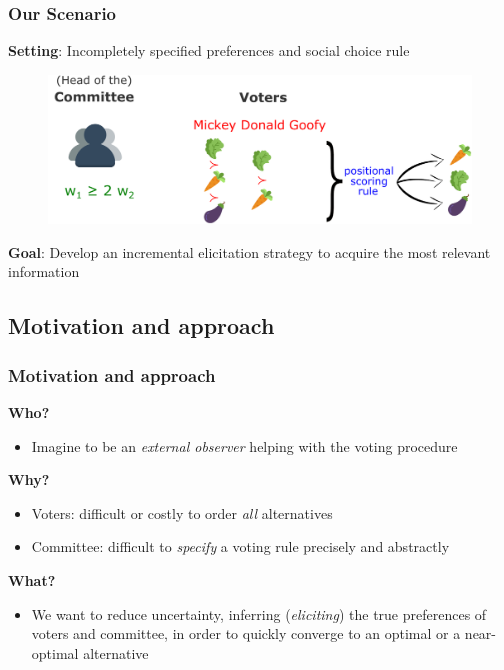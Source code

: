 \documentclass{beamer}
\begin{document}
\begin{frame}[t]
\frametitle{Our Scenario}
\textbf{Setting}: Incompletely specified preferences and social choice rule \bigskip
\begin{figure}
	\includegraphics[scale=0.35]{ourset.png}
\end{figure}
 \textbf{Goal}: Develop an incremental elicitation strategy to acquire the most relevant information 
\end{frame}

\subsection{Motivation and approach}
\begin{frame}
	\frametitle{Motivation and approach}
	\textbf{Who?}
	\begin{itemize}
		\item Imagine to be an \emph{external observer} helping with the voting procedure
	\end{itemize}
	 \textbf{Why?}
	\begin{itemize}
		\item Voters: difficult or costly to order \emph{all} alternatives
		\item Committee: difficult to \emph{specify} a voting rule precisely and abstractly
	\end{itemize}
	 \textbf{What?}
	\begin{itemize}
		\item We want to reduce uncertainty, inferring (\textit{eliciting}) the true preferences of voters and committee, in order to quickly converge to an optimal
		or a near-optimal alternative
	\end{itemize}		
\end{frame}
\end{document}
